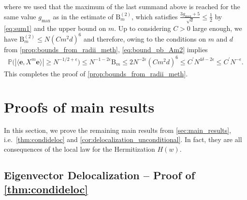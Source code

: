 \documentclass[11pt]{article}
\theoremstyle{plain}
\theoremstyle{remark}
\numberwithin{equation}{section}
\begin{document}
where we used that the maximum of the last summand above is reached for the same value $g_{\max} $ as in the estimate of $\mathrm{B}_m^{(2)}$, which satisfies $\frac{3g_{\max}+ 5}{\sqrt{d}} \le \frac{1}{2}$ by \cref{eq:sum1} and the upper bound on $m$.  Up to considering $C>0$ large enough, we have $\mathrm{B}_{m}^{(2)} \le N(Cm ^2d)^6$ and therefore, owing to the conditions on $m$ and $d$ from \cref{prop:bounds_from_radii_meth}, 
\cref{eq:bound_pb_Am2} implies
\begin{align*}
    \mathbb{P} \bigl( |\langle \mathbf e, X^m \mathbf e \rangle| \ge N^{-1/2+ \epsilon} \bigr)\le N^{-1-2\epsilon} {\mathrm{B}_{m}}\le 2N^{-2\epsilon} {(Cm^2 d)^6}  \le C^{\prime}  N^{4\delta - 2 \epsilon} \le C^\prime N^{-\epsilon}.
\end{align*}
This completes the proof of \cref{prop:bounds_from_radii_meth}. 

	\section{Proofs of main results} 
	
	In this section, we prove the remaining main results from \cref{sec:main_results}, i.e.\ 
	\cref{thm:condideloc} and \cref{cor:delocalization_unconditional}. 
	In fact, they are all consequences of the local law for the Hermitization $H(w)$. 
	
	
	\subsection{Eigenvector Delocalization -- Proof of \cref{thm:condideloc}} \label{sec:proof_delocalization} 
\end{document}
